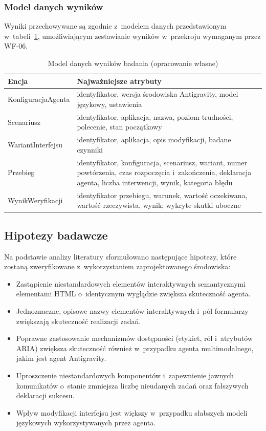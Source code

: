 \subsubsection{Model danych wyników}
Wyniki przechowywane są zgodnie z~modelem danych przedstawionym w~tabeli~\ref{tab:model}, umożliwiającym zestawianie wyników w~przekroju wymaganym przez WF-06.

\begin{table}[H]
\centering
\caption{Model danych wyników badania (opracowanie własne)}
\label{tab:model}
\footnotesize
\begin{tabularx}{\textwidth}{>{\raggedright\arraybackslash}p{3.4cm}>{\raggedright\arraybackslash}X}
\toprule
\textbf{Encja} & \textbf{Najważniejsze atrybuty} \\
\midrule
KonfiguracjaAgenta & identyfikator, wersja środowiska Antigravity, model językowy, ustawienia \\
Scenariusz & identyfikator, aplikacja, nazwa, poziom trudności, polecenie, stan początkowy \\
WariantInterfejsu & identyfikator, aplikacja, opis modyfikacji, badane czynniki \\
Przebieg & identyfikator, konfiguracja, scenariusz, wariant, numer powtórzenia, czas rozpoczęcia i~zakończenia, deklaracja agenta, liczba interwencji, wynik, kategoria błędu \\
WynikWeryfikacji & identyfikator przebiegu, warunek, wartość oczekiwana, wartość rzeczywista, wynik; wykryte skutki uboczne \\
\bottomrule
\end{tabularx}
\end{table}

\subsection{Hipotezy badawcze}
\label{sec:hipotezy}
Na podstawie analizy literatury sformułowano następujące hipotezy, które zostaną zweryfikowane z~wykorzystaniem zaprojektowanego środowiska:
\begin{itemize}
    \item[\textbf{H1}] Zastąpienie niestandardowych elementów interaktywnych semantycznymi elementami HTML o~identycznym wyglądzie zwiększa skuteczność agenta.
    \item[\textbf{H2}] Jednoznaczne, opisowe nazwy elementów interaktywnych i~pól formularzy zwiększają skuteczność realizacji zadań.
    \item[\textbf{H3}] Poprawne zastosowanie mechanizmów dostępności (etykiet, ról i~atrybutów ARIA) zwiększa skuteczność również w~przypadku agenta multimodalnego, jakim jest agent Antigravity.
    \item[\textbf{H4}] Uproszczenie niestandardowych komponentów i~zapewnienie jawnych komunikatów o~stanie zmniejsza liczbę nieudanych zadań oraz fałszywych deklaracji sukcesu.
    \item[\textbf{H5}] Wpływ modyfikacji interfejsu jest większy w~przypadku słabszych modeli językowych wykorzystywanych przez agenta.
\end{itemize}

